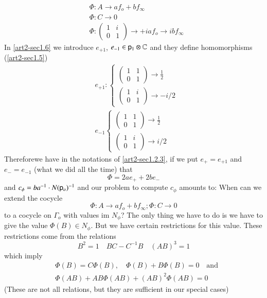 \begin{align*}
& \Phi : A\to af_{o}+bf_{\infty}\\
& \Phi : C\to 0\\
& \Phi : \left(\begin{matrix} 1 & i\\ 0 & 1\end{matrix}\right)\to +iaf_{o}\to ibf_{\infty}
\end{align*}
In \ref{art2-sec1.6} we introduce $e_{+1}$, $e_{-1}\in \mathsf{p}_{1}\otimes \mathbb{C}$ and they define homomorphisms (\ref{art2-sec1.5})
\begin{align*}
& e_{+1} : 
\begin{cases}
\left(\begin{matrix} 1 & 1\\ 0 & 1\end{matrix}\right)\to \frac{1}{2}\\
\left(\begin{matrix} 1 & i\\ 0 & 1\end{matrix}\right)\to -i/2
\end{cases}\\
& e_{-1}\begin{cases}
\left(\begin{matrix} 1 & 1\\ 0 & 1\end{matrix}\right)\to \frac{1}{2}\\
\left(\begin{matrix} 1 & i\\ 0 & 1\end{matrix}\right)\to i/2
\end{cases}
\end{align*}
Therefore\pageoriginale we have in the notations of \ref{art2-sec1.2.3}, if we put $e_{+}=e_{+1}$ and $e_{-}=e_{-1}$ (what we did all the time) that
$$
\Phi=2ae_{+}+2be_{-}
$$
and $c_{\phi}=ba^{-1}\cdot N(\mathsf{p}_{o})^{-1}$ and our problem to compute $c_{\phi}$ amounts to: When can we extend the cocycle
$$
\Phi:A\to af_{o}+bf_{\infty};\Phi:C\to 0
$$
to a cocycle on $\Gamma_{o}$ with values im $N_{\phi}$? The only thing we have to do is we have to give the value $\Phi(B)\in N_{\phi}$. But we have certain restrictions for this value. These restrictions come from the relations
$$
B^{2}=1\quad BC-C^{-1}B\quad (AB)^{3}=1
$$
which imply
\begin{align*}
& \Phi(B)=C\Phi(B),\quad \Phi(B)+B\Phi(B)=0\text{~~ and}\\
& \Phi(AB)+AB\Phi(AB)+(AB)^{2}\Phi(AB)=0
\end{align*}
(These are not all relations, but they are sufficient in our special cases)


